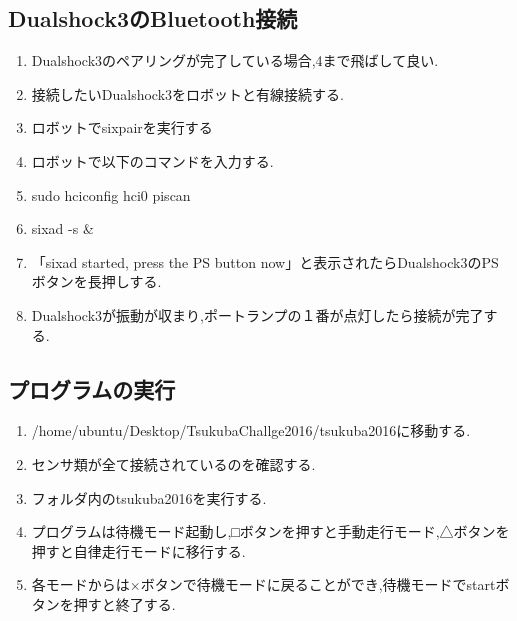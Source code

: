 \subsection{Dualshock3のBluetooth接続}
\begin{enumerate}
\item Dualshock3のペアリングが完了している場合,4まで飛ばして良い.
\item 接続したいDualshock3をロボットと有線接続する.
\item ロボットでsixpairを実行する
\item ロボットで以下のコマンドを入力する.
\item sudo hciconfig hci0 piscan
\item sixad -s \&
\item 「sixad started, press the PS button now」と表示されたらDualshock3のPSボタンを長押しする.
\item Dualshock3が振動が収まり,ポートランプの１番が点灯したら接続が完了する.
\end{enumerate}
\subsection{プログラムの実行}
\begin{enumerate}
\item /home/ubuntu/Desktop/TsukubaChallge2016/tsukuba2016に移動する.
\item センサ類が全て接続されているのを確認する.
\item フォルダ内のtsukuba2016を実行する.
\item プログラムは待機モード起動し,□ボタンを押すと手動走行モード,△ボタンを押すと自律走行モードに移行する.
\item 各モードからは×ボタンで待機モードに戻ることができ,待機モードでstartボタンを押すと終了する.
\end{enumerate}
